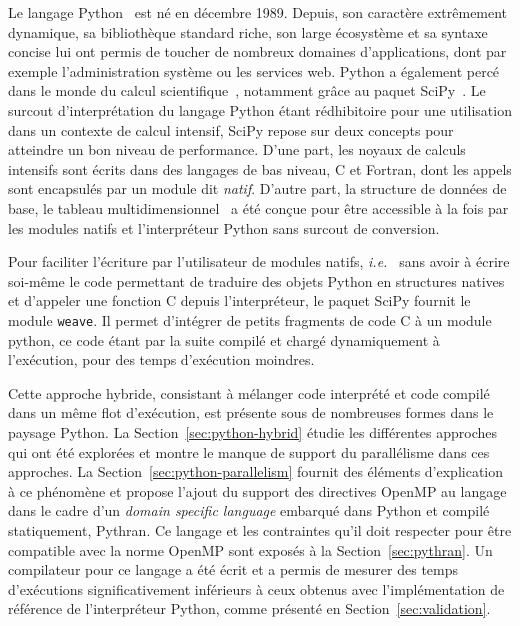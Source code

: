 \documentclass[renpar]{compas2013}
\begin{document}
Le langage Python~\cite{rossum97} est né en décembre 1989. Depuis, son
caractère extrêmement dynamique, sa bibliothèque standard riche, son large
écosystème et sa syntaxe concise lui ont permis de toucher de nombreux
domaines d'applications, dont par exemple l'administration système ou les
services web.  Python a également percé dans le monde du calcul
scientifique~\cite{Oliphant2007}, notamment grâce au paquet
SciPy~\cite{scipy}. Le surcout d'interprétation du langage Python étant
rédhibitoire pour une utilisation dans un contexte de calcul intensif,
SciPy repose sur deux concepts pour atteindre un bon niveau de
performance. D'une part, les noyaux de calculs intensifs sont écrits dans
des langages de bas niveau, C et Fortran, dont les appels sont encapsulés
par un module dit \emph{natif}. D'autre part, la structure de données de
base, le tableau multidimensionnel~\cite{numpyarray2011} a été conçue pour
être accessible à la fois par les modules natifs et l'interpréteur Python
sans surcout de conversion.

Pour faciliter l'écriture par l'utilisateur de modules natifs, \emph{i.e.\
} sans avoir à écrire soi-même le code permettant de traduire des objets
Python en structures natives et d'appeler une fonction C depuis
l'interpréteur, le paquet SciPy fournit le module \texttt{weave}. Il
permet d'intégrer de petits fragments de code C à un module python, ce
code étant par la suite compilé et chargé dynamiquement à l'exécution,
pour des temps d'exécution moindres.

Cette approche hybride, consistant à mélanger code interprété et code
compilé dans un même flot d'exécution, est présente sous de nombreuses
formes dans le paysage Python. La Section~\ref{sec:python-hybrid} étudie
les différentes approches qui ont été explorées et montre le manque de
support du parallélisme dans ces approches. La
Section~\ref{sec:python-parallelism} fournit des éléments d'explication à
ce phénomène et propose l'ajout du support des directives OpenMP au
langage dans le cadre d'un \emph{domain specific language} embarqué dans
Python et compilé statiquement, Pythran. Ce langage et les contraintes
qu'il doit respecter pour être compatible avec
la norme OpenMP sont exposés à la Section~\ref{sec:pythran}. Un
compilateur pour ce langage a été écrit et a permis de mesurer des temps
d'exécutions significativement inférieurs à ceux obtenus avec
l'implémentation de référence de l'interpréteur Python, comme présenté en
Section~\ref{sec:validation}.

\end{document}
